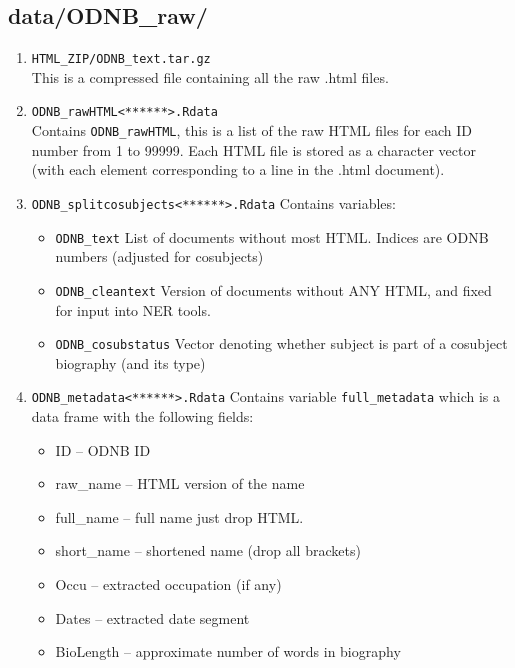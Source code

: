 \documentclass[11pt]{article}
\newcommand{\filename}[1]{\texttt{#1}}
\begin{document}
\subsection{data/ODNB\_raw/}
\begin{enumerate}
\item \filename{HTML\_ZIP/ODNB\_text.tar.gz} \\
This is a compressed file containing all the raw .html files. \\

\item \filename{ODNB\_rawHTML<******>.Rdata} \\
Contains \texttt{ODNB\_rawHTML}, this is a list of the raw HTML files for each ID number from 1 to 99999. Each HTML file is stored as a character vector (with each element corresponding to a line in the .html document).  

\item \filename{ODNB\_splitcosubjects<******>.Rdata}
Contains variables: 
\begin{itemize}
\item \texttt{ODNB\_text} List of documents without most HTML. Indices are ODNB numbers (adjusted for cosubjects)
\item \texttt{ODNB\_cleantext} Version of documents without ANY HTML, and fixed for input into NER tools. 
\item \texttt{ODNB\_cosubstatus} Vector denoting whether subject is part of a cosubject biography (and its type)
\end{itemize}

\item \filename{ODNB\_metadata<******>.Rdata}
Contains variable \texttt{full\_metadata} which is a data frame with the following fields: 
\begin{itemize}
\item ID -- ODNB ID
\item raw\_name -- HTML version of the name
\item full\_name -- full name just drop HTML. 
\item short\_name -- shortened name (drop all brackets)
\item Occu -- extracted occupation (if any)
\item Dates -- extracted date segment
\item BioLength -- approximate number of words in biography
\end{itemize}
\end{enumerate}
\end{document}
